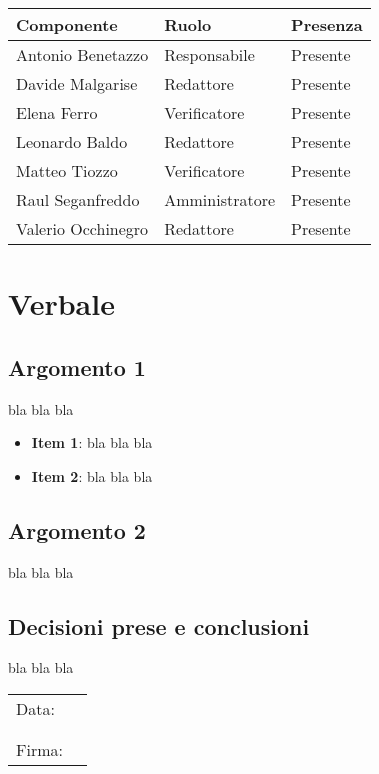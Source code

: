 \documentclass[italian,12pt]{article}
\begin{document}
\begin{flushleft}
	\begin{table}[!h]
	\begin{tabular}{ |l|l|l| } 
		\hline
		\textbf{Componente} & \textbf{Ruolo} & \textbf{Presenza} \\
		\hline 
		Antonio Benetazzo 	& Responsabile   & Presente \\
		Davide Malgarise 	& Redattore      & Presente \\
		Elena Ferro 		& Verificatore   & Presente \\
		Leonardo Baldo 		& Redattore      & Presente \\ 
		Matteo Tiozzo 		& Verificatore   & Presente \\ 
		Raul Seganfreddo 	& Amministratore & Presente \\
		Valerio Occhinegro 	& Redattore      & Presente \\
		\hline
	\end{tabular}
	\end{table}
\end{flushleft}

\newpage

\section{Verbale}

\subsection{Argomento 1}
bla bla bla
\begin{itemize}
	\item \textbf{Item 1}: bla bla bla
	\item \textbf{Item 2}: bla bla bla
\end{itemize}

\subsection{Argomento 2}
bla bla bla

\subsection{Decisioni prese e conclusioni}
bla bla bla


\newpage
\begin{table}[b]
	\begin{tabular}{@{}p{.5in}p{4in}@{}}
		Data:  & \hrulefill \\
			   &     		\\
			   &     		\\
		Firma: & \hrulefill \\
	\end{tabular}
	\end{table}
\end{document}
